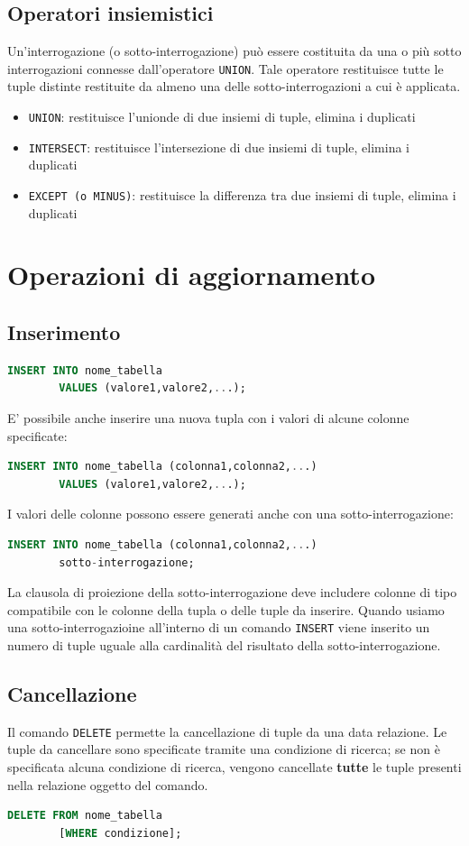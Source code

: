 \documentclass[12pt, a4paper]{report}
\begin{document}
    \subsection{Operatori insiemistici}
    Un'interrogazione (o sotto-interrogazione) può essere costituita da una o più sotto interrogazioni connesse dall'operatore \texttt{UNION}. Tale operatore restituisce tutte le tuple distinte restituite da almeno una delle sotto-interrogazioni a cui è applicata.
    \begin{itemize}
        \item \texttt{UNION}: restituisce l'unionde di due insiemi di tuple, elimina i duplicati
        \item \texttt{INTERSECT}: restituisce l'intersezione di due insiemi di tuple, elimina i duplicati
        \item \texttt{EXCEPT (o MINUS)}: restituisce la differenza tra due insiemi di tuple, elimina i duplicati
    \end{itemize}
    \section{Operazioni di aggiornamento}
    \subsection{Inserimento}
    \begin{lstlisting}[language=SQL]
        INSERT INTO nome_tabella
        VALUES (valore1,valore2,...);
    \end{lstlisting}
    E' possibile anche inserire una nuova tupla con i valori di alcune colonne specificate:
    \begin{lstlisting}[language=SQL]
        INSERT INTO nome_tabella (colonna1,colonna2,...)
        VALUES (valore1,valore2,...);
    \end{lstlisting}
    I valori delle colonne possono essere generati anche con una sotto-interrogazione:
    \begin{lstlisting}[language=SQL]
        INSERT INTO nome_tabella (colonna1,colonna2,...)
        sotto-interrogazione;
    \end{lstlisting}
    La clausola di proiezione della sotto-interrogazione deve includere colonne di tipo compatibile con le colonne della tupla o delle tuple da inserire. Quando usiamo una sotto-interrogazioine all'interno di un comando \texttt{INSERT} viene inserito un numero di tuple uguale alla cardinalità del risultato della sotto-interrogazione.
    \subsection{Cancellazione}
    Il comando \texttt{DELETE} permette la cancellazione di tuple da una data relazione. Le tuple da cancellare sono specificate tramite una condizione di ricerca; se non è specificata alcuna condizione di ricerca, vengono cancellate \textbf{tutte} le tuple presenti nella relazione oggetto del comando.
    \begin{lstlisting}[language=SQL]
        DELETE FROM nome_tabella
        [WHERE condizione];
    \end{lstlisting}
\end{document}

